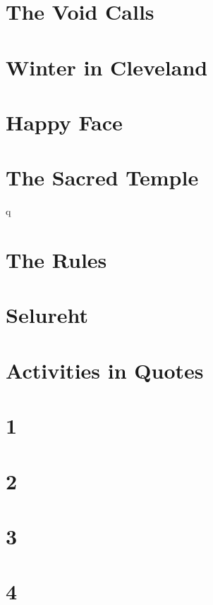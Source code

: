 \chapter{The Void Calls}


\chapter{Winter in Cleveland}


\chapter{Happy Face}


\chapter{The Sacred Temple}q


\chapter{The Rules}


\chapter{Selureht}


\chapter{Activities in Quotes}


\chapter{1}


\chapter{2}


\chapter{3}


\chapter{4}


